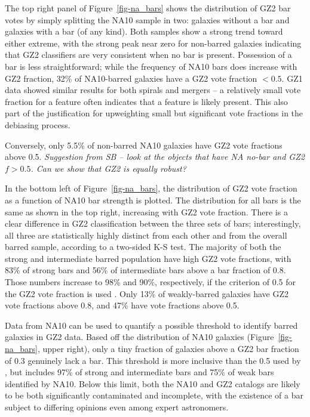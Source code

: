 \documentclass[useAMS,usenatbib]{mn2e}
\begin{document}
The top right panel of Figure~\ref{fig-na_bars} shows the distribution of GZ2 bar votes by simply splitting the NA10 sample in two: galaxies without a bar and galaxies with a bar (of any kind). Both samples show a strong trend toward either extreme, with the strong peak near zero for non-barred galaxies indicating that GZ2 classifiers are very consistent when no bar is present. Possession of a bar is less straightforward; while the frequency of NA10 bars does increase with GZ2 fraction, 32\% of NA10-barred galaxies have a GZ2 vote fraction $<0.5$. GZ1 data showed similar results for both spirals \citep{bam09} and mergers \citep{dar10a} -- a relatively small vote fraction for a feature often indicates that a feature is likely present. This also part of the justification for upweighting small but significant vote fractions in the debiasing process.  

Conversely, only 5.5\% of non-barred NA10 galaxies have GZ2 vote fractions above 0.5. {\em Suggestion from SB -- look at the objects that have NA no-bar and GZ2 $f > 0.5$. Can we show that GZ2 is equally robust?}

In the bottom left of Figure~\ref{fig-na_bars}, the distribution of GZ2 vote fraction as a function of NA10 bar strength is plotted. The distribution for all bars is the same as shown in the top right, increasing with GZ2 vote fraction. There is a clear difference in GZ2 classification between the three sets of bars; interestingly, all three are statistically highly distinct from each other and from the overall barred sample, according to a two-sided K-S test. The majority of both the strong and intermediate barred population have high GZ2 vote fractions, with 83\% of strong bars and 56\% of intermediate bars above a bar fraction of 0.8. Those numbers increase to 98\% and 90\%, respectively, if the criterion of 0.5 for the GZ2 vote fraction is used \citep{mas11c}. Only 13\% of weakly-barred galaxies have GZ2 vote fractions above 0.8, and 47\% have vote fractions above 0.5. 

Data from NA10 can be used to quantify a possible threshold to identify barred galaxies in GZ2 data. Based off the distribution of NA10 galaxies (Figure~\ref{fig-na_bars}, upper right), only a tiny fraction of galaxies above a GZ2 bar fraction of 0.3 genuinely lack a bar. This threshold is more inclusive than the 0.5 used by \citet{mas11c}, but includes 97\% of strong and intermediate bars and 75\% of weak bars identified by NA10. Below this limit, both the NA10 and GZ2 catalogs are likely to be both significantly contaminated and incomplete, with the existence of a bar subject to differing opinions even among expert astronomers. 
\end{document}
